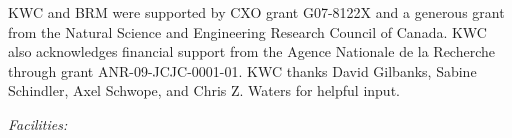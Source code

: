 \documentclass[11pt, preprint]{aastex}
\begin{document}
\acknowledgements

KWC and BRM were supported by CXO grant G07-8122X and a generous grant
from the Natural Science and Engineering Research Council of
Canada. KWC also acknowledges financial support from the Agence
Nationale de la Recherche through grant ANR-09-JCJC-0001-01. KWC
thanks David Gilbanks, Sabine Schindler, Axel Schwope, and Chris
Z. Waters for helpful input.


{\it Facilities:}  
 






\end{document}
